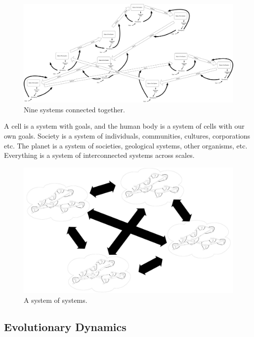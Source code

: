 \begin{figure}[h]
 \centering
 \includegraphics[width=1\textwidth]{pictures/9sys}
 \caption{Nine systems connected together.}
 \label{fig:9sys}
\end{figure}

A cell is a system with goals, and the human body is a system of cells with our own goals. Society is a system of individuals, communities, cultures, corporations etc. The planet is a system of societies, geological systems, other organisms, etc. Everything is a system of interconnected systems across scales.

\begin{figure}[h]
 \centering
 \includegraphics[width=1\textwidth]{pictures/metasys}
 \caption{A system of systems.}
 \label{fig:metasys}
\end{figure}

\subsection{Evolutionary Dynamics}
\label{intro:evolution}

